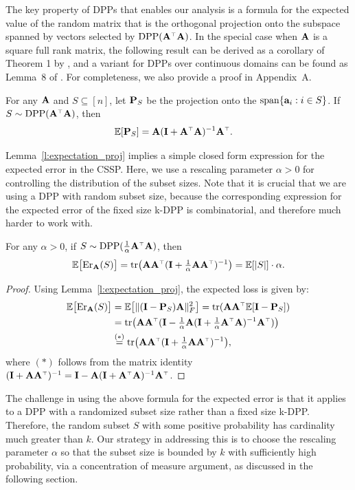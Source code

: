 \documentclass{article}
\begin{document}
The key property of DPPs that enables our analysis is a
formula for the expected value of the random matrix that is the orthogonal projection onto the
subspace spanned by vectors selected by $\DPP(\A^\top\A)$.
In the special case when $\A$ is a square full rank matrix, the
following result can be derived as a corollary of Theorem 1 by
\citet{randomized-newton}, and a variant for DPPs over
continuous domains can be found as Lemma~8 of
\citet{surrogate-design}. For completeness, we also provide a proof in
Appendix~A.
\begin{lemma}\label{l:expectation_proj}
  For any $\A$ and $S\subseteq [n]$, let $\P_S$ be the  
projection onto the $\mathrm{span}\{\a_i:i\in S\}$. If $S\sim \DPP(\A^\top\A)$, then
\begin{align*}
  \E[\P_S] & = \A(\I+\A^\top\A)^{-1}\A^\top.
\end{align*}
\end{lemma}
Lemma~\ref{l:expectation_proj} implies a simple closed form expression for
the expected error in the CSSP. Here, we use a
rescaling parameter $\alpha>0$ for controlling
the distribution of the subset sizes. Note that it is crucial that we
are using a DPP with random subset size, because the corresponding
expression for the expected error of the fixed size k-DPP is
combinatorial, and therefore much harder to work with.
\begin{lemma}\label{l:expected-error}
  For any $\alpha>0$, if $S\sim
  \DPP(\frac1\alpha\A^\top\A)$, then
  \begin{align*}
    \E\big[\Er_\A(S)\big] =
    \tr\big(\A\A^\top(\I+\tfrac1\alpha\A\A^\top)^{-1}\big) = \E[|S|]\cdot\alpha.
  \end{align*}
\end{lemma}
\begin{proof}
Using Lemma~\ref{l:expectation_proj}, the expected loss is given by:
	\begin{align*}
          \E\big[\Er_\A(S)\big]
          &= \E\big[ \|(\I-\P_S)\A\|_F^2\big]
            = \tr(\A\A^\top\E[\I-\P_S]) \\
          &=\tr\big(\A\A^\top
            (\I-\tfrac1\alpha\A(\I+\tfrac1\alpha\A^\top\A)^{-1}\A^\top)\big)\\
          &\overset{(*)}{=}\tr\big(\A\A^\top(\I+\tfrac1\alpha\A\A^\top)^{-1}\big),
	\end{align*}
where $(*)$ follows from the matrix identity
$(\I+\A\A^\top)^{-1}=\I-\A(\I+\A^\top\A)^{-1}\A^\top$. 
\end{proof}
The challenge in using the above formula for the expected error is
that it applies to a DPP with a randomized subset size rather than a
fixed size k-DPP. Therefore, the random subset
$S$ with some positive probability has cardinality much greater than $k$.
Our strategy in addressing this is to choose
the rescaling parameter $\alpha$ so that the subset size is bounded by
$k$ with sufficiently high probability, via a concentration of measure
argument, as discussed in the following section.
\end{document}
